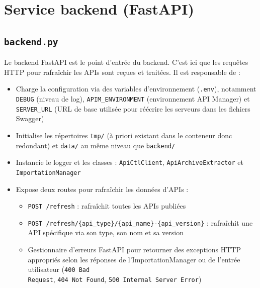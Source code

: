 \section{Service backend (FastAPI)}
\subsection{\texttt{backend.py}}
Le backend FastAPI est le point d'entrée du backend. C'est ici que les requêtes HTTP pour rafraîchir les APIs sont reçues et traitées. Il est responsable de :

\begin{itemize}
    \item[$\bullet$] Charge la configuration via des variables d'environnement (\texttt{.env}), notamment \texttt{DEBUG} (niveau de log), \texttt{APIM\_ENVIRONMENT} (environnement API Manager) et \texttt{SERVER\_URL} (URL de base utilisée pour réécrire les serveurs dans les fichiers Swagger)
    \item[$\bullet$] Initialise les répertoires \texttt{tmp/} (à priori existant dans le conteneur donc redondant) et \texttt{data/} au même niveau que \texttt{backend/}
    \item[$\bullet$] Instancie le logger et les classes : \texttt{ApiCtlClient}, \texttt{ApiArchiveExtractor} et\\ \texttt{ImportationManager}
    \item[$\bullet$] Expose deux routes pour rafraîchir les données d'APIs :
    \begin{itemize}
        \item[$\circ$] \texttt{POST /refresh} : rafraîchit toutes les APIs publiées
        \item[$\circ$] \texttt{POST /refresh/\{api\_type\}/\{api\_name\}-\{api\_version\}} : rafraîchit une API spécifique via son type, son nom et sa version
        \item[$\circ$] Gestionnaire d'erreurs FastAPI pour retourner des exceptions HTTP appropriés selon les réponses de l'ImportationManager ou de l'entrée utilisateur (\texttt{400 Bad\\ Request}, \texttt{404 Not Found}, \texttt{500 Internal Server Error})
    \end{itemize}
\end{itemize}


